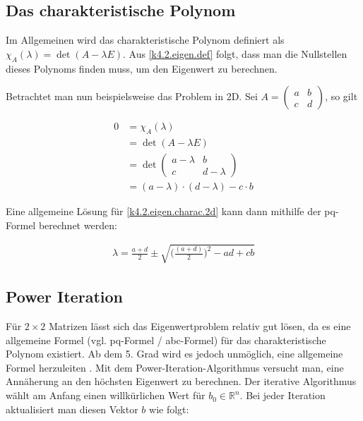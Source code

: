 \documentclass[]{dsadokumentation}
\begin{document}
\subsection{Das charakteristische Polynom}

Im Allgemeinen wird das charakteristische Polynom definiert als $\chi_A (\lambda) = \det(A - \lambda E)$. Aus \cref{k4.2.eigen.def} folgt, dass man die Nullstellen dieses Polynoms finden muss, um den Eigenwert zu berechnen.

Betrachtet man nun beispielsweise das Problem in 2D. Sei $A = \begin{pmatrix}
    a & b \\
    c & d
  \end{pmatrix}$, so gilt

\begin{equation}
  \label{k4.2.eigen.charac.2d}
  \begin{aligned}
    0
     & = \chi_A (\lambda)                              \\
     & = \det(A - \lambda E)                           \\
     & = \det \begin{pmatrix}
                a - \lambda & b         \\
                c           & d-\lambda
              \end{pmatrix}                  \\
     & = (a - \lambda) \cdot (d - \lambda) - c \cdot b
  \end{aligned}
\end{equation}

Eine allgemeine Lösung für \cref{k4.2.eigen.charac.2d} kann dann mithilfe der pq-Formel berechnet werden:

\begin{equation}
  \begin{aligned}
    \lambda = \frac{a+d}{2} \pm \sqrt{\Big(\frac{(a+d)}{2}\Big)^2-ad+cb}
  \end{aligned}
\end{equation}


\subsection{Power Iteration}\label{k4.2.eigen.powerit}

Für $2 \times 2$ Matrizen lässt sich das Eigenwertproblem relativ gut lösen, da es eine allgemeine Formel (vgl. pq-Formel / abc-Formel) für das charakteristische Polynom existiert. Ab dem 5. Grad wird es jedoch unmöglich, eine allgemeine Formel herzuleiten \parencite{k4.2.ramond}. %
Mit dem Power-Iteration-Algorithmus versucht man, eine Annäherung an den höchsten Eigenwert zu berechnen. Der iterative Algorithmus wählt am Anfang einen willkürlichen Wert für $b_0 \in \mathbb{R}^n$. Bei jeder Iteration aktualisiert man diesen Vektor $b$ wie folgt:
\end{document}
